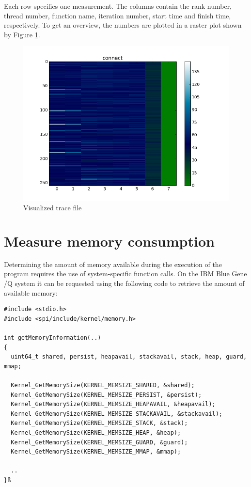 Each row specifies one measurement. The columns contain the rank number, thread number, function name,
iteration number, start time and finish time, respectively.
To get an overview, the numbers are plotted in a raster plot shown by Figure \ref{fig:tracefile}.
\begin{figure}[ht!]
\centering
\includegraphics[scale=0.4]{pictures/1per300_tracefile_connect.png}
\caption{Visualized trace file}
\label{fig:tracefile}
\end{figure}

\section{Measure memory consumption}
\label{bgqmemory}
Determining the amount of memory available during the execution of the program requires the use of system-specific function calls. 
On the IBM Blue Gene /Q system it can be requested using the following code to retrieve the amount of available memory:
\begin{lstlisting}
#include <stdio.h>
#include <spi/include/kernel/memory.h>

int getMemoryInformation(..)
{
  uint64_t shared, persist, heapavail, stackavail, stack, heap, guard, mmap;

  Kernel_GetMemorySize(KERNEL_MEMSIZE_SHARED, &shared);
  Kernel_GetMemorySize(KERNEL_MEMSIZE_PERSIST, &persist);
  Kernel_GetMemorySize(KERNEL_MEMSIZE_HEAPAVAIL, &heapavail);
  Kernel_GetMemorySize(KERNEL_MEMSIZE_STACKAVAIL, &stackavail);
  Kernel_GetMemorySize(KERNEL_MEMSIZE_STACK, &stack);
  Kernel_GetMemorySize(KERNEL_MEMSIZE_HEAP, &heap);
  Kernel_GetMemorySize(KERNEL_MEMSIZE_GUARD, &guard);
  Kernel_GetMemorySize(KERNEL_MEMSIZE_MMAP, &mmap);

  ..
}ß

\end{lstlisting}

